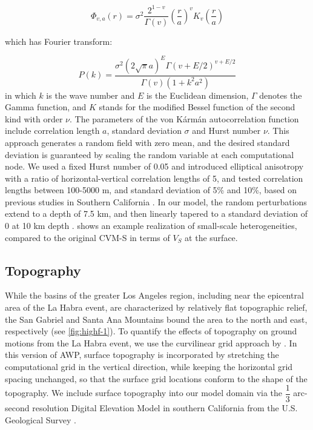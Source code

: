 \begin{equation}\label{eq:highf-1}
  \Phi_{v, a}(r)=\sigma^{2} \dfrac{2^{1-v}}{\Gamma(v)}\left(\dfrac{r}{a}\right)^{v} K_{v}\left(\dfrac{r}{a}\right)
\end{equation}

\noindent which has Fourier transform:

\begin{equation}\label{eq:highf-2}
  P(k)=\dfrac{\sigma^{2}(2 \sqrt{\pi} a)^{E} \Gamma(v+E / 2)^{v+E / 2}}{\Gamma(v)\left(1+k^{2} a^{2}\right)}
\end{equation}
\noindent in which $k$ is the wave number and $E$ is the Euclidean dimension, $\Gamma$ denotes the Gamma function, and $K$ stands for the modiﬁed Bessel function of the second kind with order $\nu$. The parameters of the von K\'arm\'an autocorrelation function include correlation length $a$, standard deviation $\sigma$ and Hurst number $\nu$. This approach generates a random field with zero mean, and the desired standard deviation is guaranteed by scaling the random variable at each computational node. We used a fixed Hurst number of 0.05 and introduced elliptical anisotropy with a ratio of horizontal-vertical correlation lengths of 5, and tested correlation lengths between 100-5000 m, and standard deviation of 5\% and 10\%, based on previous studies in Southern California . In our model, the random perturbations extend to a depth of 7.5 km, and then linearly tapered to a standard deviation of 0 at 10 km depth \citep{olsen2018constraints}.  shows an example realization of small-scale heterogeneities, compared to the original CVM-S in terms of $V_S$ at the surface.

\subsection{Topography}
While the basins of the greater Los Angeles region, including near the epicentral area of the La Habra event, are characterized by relatively flat topographic relief, the San Gabriel and Santa Ana Mountains bound the area to the north and east, respectively (see \cref{fig:highf-1}). To quantify the effects of topography on ground motions from the La Habra event, we use the curvilinear grid approach by \citet{oreillyHighorderFiniteDifference2021}. In this version of AWP, surface topography is incorporated by stretching the computational grid in the vertical direction, while keeping the horizontal grid spacing unchanged, so that the surface grid locations conform to the shape of the topography. We include surface topography into our model domain via the $\dfrac{1}{3}$ arc-second resolution Digital Elevation Model in southern California from the U.S. Geological Survey \citep{USGS3DEP}.

